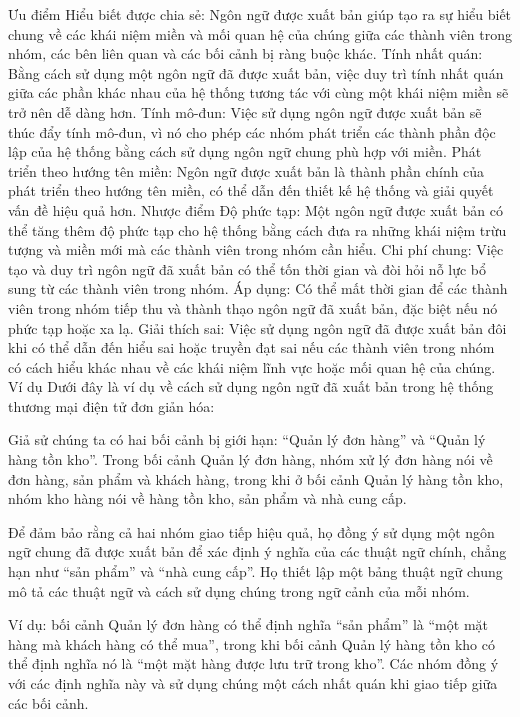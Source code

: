Ưu điểm
Hiểu biết được chia sẻ: Ngôn ngữ được xuất bản giúp tạo ra sự hiểu biết chung về các khái niệm miền và mối quan hệ của chúng giữa các thành viên trong nhóm, các bên liên quan và các bối cảnh bị ràng buộc khác.
Tính nhất quán: Bằng cách sử dụng một ngôn ngữ đã được xuất bản, việc duy trì tính nhất quán giữa các phần khác nhau của hệ thống tương tác với cùng một khái niệm miền sẽ trở nên dễ dàng hơn.
Tính mô-đun: Việc sử dụng ngôn ngữ được xuất bản sẽ thúc đẩy tính mô-đun, vì nó cho phép các nhóm phát triển các thành phần độc lập của hệ thống bằng cách sử dụng ngôn ngữ chung phù hợp với miền.
Phát triển theo hướng tên miền: Ngôn ngữ được xuất bản là thành phần chính của phát triển theo hướng tên miền, có thể dẫn đến thiết kế hệ thống và giải quyết vấn đề hiệu quả hơn.
Nhược điểm
Độ phức tạp: Một ngôn ngữ được xuất bản có thể tăng thêm độ phức tạp cho hệ thống bằng cách đưa ra những khái niệm trừu tượng và miền mới mà các thành viên trong nhóm cần hiểu.
Chi phí chung: Việc tạo và duy trì ngôn ngữ đã xuất bản có thể tốn thời gian và đòi hỏi nỗ lực bổ sung từ các thành viên trong nhóm.
Áp dụng: Có thể mất thời gian để các thành viên trong nhóm tiếp thu và thành thạo ngôn ngữ đã xuất bản, đặc biệt nếu nó phức tạp hoặc xa lạ.
Giải thích sai: Việc sử dụng ngôn ngữ đã được xuất bản đôi khi có thể dẫn đến hiểu sai hoặc truyền đạt sai nếu các thành viên trong nhóm có cách hiểu khác nhau về các khái niệm lĩnh vực hoặc mối quan hệ của chúng.
Ví dụ
Dưới đây là ví dụ về cách sử dụng ngôn ngữ đã xuất bản trong hệ thống thương mại điện tử đơn giản hóa:

Giả sử chúng ta có hai bối cảnh bị giới hạn: “Quản lý đơn hàng” và “Quản lý hàng tồn kho”. Trong bối cảnh Quản lý đơn hàng, nhóm xử lý đơn hàng nói về đơn hàng, sản phẩm và khách hàng, trong khi ở bối cảnh Quản lý hàng tồn kho, nhóm kho hàng nói về hàng tồn kho, sản phẩm và nhà cung cấp.

Để đảm bảo rằng cả hai nhóm giao tiếp hiệu quả, họ đồng ý sử dụng một ngôn ngữ chung đã được xuất bản để xác định ý nghĩa của các thuật ngữ chính, chẳng hạn như “sản phẩm” và “nhà cung cấp”. Họ thiết lập một bảng thuật ngữ chung mô tả các thuật ngữ và cách sử dụng chúng trong ngữ cảnh của mỗi nhóm.

Ví dụ: bối cảnh Quản lý đơn hàng có thể định nghĩa “sản phẩm” là “một mặt hàng mà khách hàng có thể mua”, trong khi bối cảnh Quản lý hàng tồn kho có thể định nghĩa nó là “một mặt hàng được lưu trữ trong kho”. Các nhóm đồng ý với các định nghĩa này và sử dụng chúng một cách nhất quán khi giao tiếp giữa các bối cảnh.

